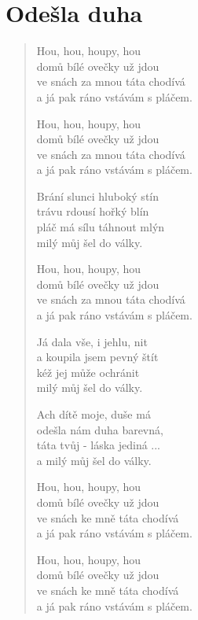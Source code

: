 \section{Odešla duha}

\begin{verse}
Hou, hou, houpy, hou \\
domů bílé ovečky už jdou \\
ve snách za mnou táta chodívá \\
a já pak ráno vstávám s pláčem.

Hou, hou, houpy, hou \\
domů bílé ovečky už jdou \\
ve snách za mnou táta chodívá \\
a já pak ráno vstávám s pláčem.

Brání slunci hluboký stín \\
trávu rdousí hořký blín \\
pláč má sílu táhnout mlýn \\
milý můj šel do války. 

Hou, hou, houpy, hou \\
domů bílé ovečky už jdou \\
ve snách za mnou táta chodívá \\
a já pak ráno vstávám s pláčem.

Já dala vše, i jehlu, nit \\
a koupila jsem pevný štít  \\
kéž jej může ochránit \\ 
milý můj šel do války. 

Ach dítě moje, duše má \\
odešla nám duha barevná, \\
táta tvůj - láska jediná ...\\
a milý můj šel do války. 

Hou, hou, houpy, hou \\
domů bílé ovečky už jdou \\
ve snách ke mně táta chodívá \\
a já pak ráno vstávám s pláčem.

Hou, hou, houpy, hou \\
domů bílé ovečky už jdou \\
ve snách ke mně táta chodívá \\
a já pak ráno vstávám s pláčem.


\end{verse}
